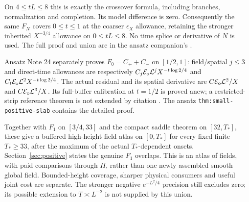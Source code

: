 On $4\le tL\le8$ this is exactly the crossover formula, including
branches, normalization and completion. Its model difference is zero.
Consequently the same $F_N$ covers $0\le t\le1$ at the coarser
$\epsilon_X$ allowance, retaining the stronger inherited $X^{-3/4}$
allowance on $0\le tL\le8$. No time splice or derivative of $N$ is used.
The full proof and union are in the ansatz companion's
.

Ansatz Note 24 separately proves $F_0=C_++C_-$ on $[1/2,1]$:
field/spatial $j\le3$ and direct-time allowances are respectively
$C_j\mathcal E_{\mathrm o}\mathcal L^jX^{-t\log2/4}$ and
$C_t\mathcal E_{\mathrm o}\mathcal L^2X^{-t\log2/4}$. The actual residual and its spatial
derivative are $C\mathcal E_{\mathrm o}\mathcal L^2/X$ and $C\mathcal E_{\mathrm o}\mathcal L^3/X$.
Its full-buffer calibration at $t=1/2$ is proved anew; a restricted-strip
reference theorem is not extended by citation \cite{small-positive}.
The ansatz \texttt{thm:small-positive-slab} contains the detailed proof.

Together with $F_1$ on $[3/4,33]$ and the compact saddle theorem on
$[32,T_*]$, these give a buffered high-height field atlas on $[0,T_*]$
for every fixed finite $T_*\ge33$, after the maximum of the actual
$T_*$-dependent onsets. Section~\ref{sec:positive} states the genuine
$F_1$ overlaps. This is an atlas of fields, with paid comparisons through
$H$, rather than one newly assembled smooth global field. Bounded-height
coverage, sharper physical consumers and useful joint cost are separate.
The stronger negative $e^{-L^2/4}$ precision still excludes zero; its
possible extension to $T\asymp L^{-2}$ is not supplied by this union.
